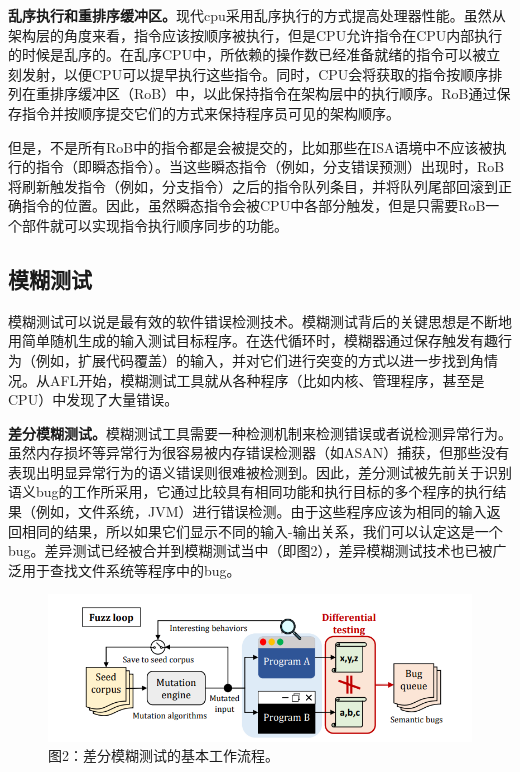 \textbf{乱序执行和重排序缓冲区。}现代cpu采用乱序执行的方式提高处理器性能。虽然从架构层的角度来看，指令应该按顺序被执行，但是CPU允许指令在CPU内部执行的时候是乱序的。在乱序CPU中，所依赖的操作数已经准备就绪的指令可以被立刻发射，以便CPU可以提早执行这些指令。同时，CPU会将获取的指令按顺序排列在重排序缓冲区（RoB）中，以此保持指令在架构层中的执行顺序。RoB通过保存指令并按顺序提交它们的方式来保持程序员可见的架构顺序。\par

但是，不是所有RoB中的指令都是会被提交的，比如那些在ISA语境中不应该被执行的指令（即瞬态指令）。当这些瞬态指令（例如，分支错误预测）出现时，RoB将刷新触发指令（例如，分支指令）之后的指令队列条目，并将队列尾部回滚到正确指令的位置。因此，虽然瞬态指令会被CPU中各部分触发，但是只需要RoB一个部件就可以实现指令执行顺序同步的功能。\par

\subsection{模糊测试}

模糊测试可以说是最有效的软件错误检测技术。模糊测试背后的关键思想是不断地用简单随机生成的输入测试目标程序。在迭代循环时，模糊器通过保存触发有趣行为（例如，扩展代码覆盖）的输入，并对它们进行突变的方式以进一步找到角情况。从AFL开始，模糊测试工具就从各种程序（比如内核、管理程序，甚至是CPU）中发现了大量错误。\par

\textbf{差分模糊测试。}模糊测试工具需要一种检测机制来检测错误或者说检测异常行为。虽然内存损坏等异常行为很容易被内存错误检测器（如ASAN）捕获，但那些没有表现出明显异常行为的语义错误则很难被检测到。因此，差分测试被先前关于识别语义bug的工作所采用，它通过比较具有相同功能和执行目标的多个程序的执行结果（例如，文件系统，JVM）进行错误检测。由于这些程序应该为相同的输入返回相同的结果，所以如果它们显示不同的输入-输出关系，我们可以认定这是一个bug。差异测试已经被合并到模糊测试当中（即图2），差异模糊测试技术也已被广泛用于查找文件系统等程序中的bug。\par

\begin{figure}[!h]
    \centering
    \includegraphics[width=\linewidth]{figure/proposal/specdoctor-figure2.png}
    \caption*{图2：差分模糊测试的基本工作流程。}
\end{figure}

